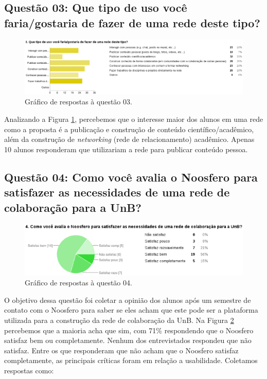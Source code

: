 \subsection*{Questão 03: Que tipo de uso você faria/gostaria de fazer de uma
rede deste tipo?}

\begin{figure}[h!]
    \centering
    \includegraphics[keepaspectratio=true,scale=0.5]
      {figuras/p3.eps}
    \caption{Gráfico de respostas à questão 03.}
    \label{response:3}
\end{figure}

Analizando a Figura \ref{response:3}, percebemos que o interesse maior dos
alunos em uma rede como a proposta é a publicação e construção de conteúdo
científico/acadêmico, além da construção de \textit{networking} (rede de
relacionamento) acadêmico. Apenas 10 alunos responderam que utilizariam a rede
para publicar conteúdo pessoa.

\subsection*{Questão 04: Como você avalia o Noosfero para satisfazer as
necessidades de uma rede de colaboração para a UnB?}

\begin{figure}[h!]
    \centering
    \includegraphics[keepaspectratio=true,scale=0.55]
      {figuras/p4.eps}
    \caption{Gráfico de respostas à questão 04.}
    \label{response:4}
\end{figure}

O objetivo dessa questão foi coletar a opinião dos alunos após um semestre de
contato com o Noosfero para saber se eles acham que este pode ser a plataforma
utilizada para a construção da rede de colaboração da UnB. Na Figura
\ref{response:4} percebemos que a maioria acha que sim, com 71\% respondendo
que o Noosfero satisfaz bem ou completamente. Nenhum dos entrevistados
respondeu que não satisfaz.
%
Entre os que responderam que não acham que o Noosfero satisfaz completamente,
as principais críticas foram em relação a usabilidade. Coletamos respostas
como:

